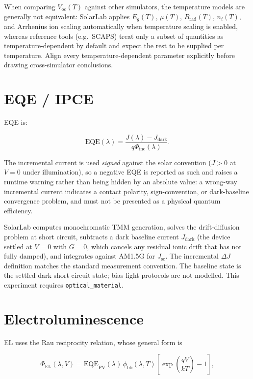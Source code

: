 \documentclass[
  11pt,
  american,
]{report}
\begin{document}
When comparing \(V_\mathrm{oc}(T)\) against other simulators, the
temperature models are generally not equivalent: SolarLab applies
\(E_g(T)\), \(\mu(T)\), \(B_\mathrm{rad}(T)\), \(n_i(T)\), and Arrhenius
ion scaling automatically when temperature scaling is enabled, whereas
reference tools (e.g.~SCAPS) treat only a subset of quantities as
temperature-dependent by default and expect the rest to be supplied per
temperature. Align every temperature-dependent parameter explicitly
before drawing cross-simulator conclusions.

\hypertarget{eqe-ipce}{%
\section{EQE / IPCE}\label{eqe-ipce}}

EQE is:

\[
\mathrm{EQE}(\lambda)
=
\frac{J(\lambda)-J_\mathrm{dark}}
{q\Phi_\mathrm{inc}(\lambda)}.
\]

The incremental current is used \emph{signed} against the solar
convention (\(J>0\) at \(V=0\) under illumination), so a negative EQE is
reported as such and raises a runtime warning rather than being hidden
by an absolute value: a wrong-way incremental current indicates a
contact polarity, sign-convention, or dark-baseline convergence problem,
and must not be presented as a physical quantum efficiency.

SolarLab computes monochromatic TMM generation, solves the
drift-diffusion problem at short circuit, subtracts a dark baseline
current \(J_\mathrm{dark}\) (the device settled at \(V=0\) with \(G=0\),
which cancels any residual ionic drift that has not fully damped), and
integrates against AM1.5G for \(J_\mathrm{sc}\). The incremental
\(\Delta J\) definition matches the standard measurement convention. The
baseline state is the settled dark short-circuit state; bias-light
protocols are not modelled. This experiment requires
\texttt{optical\_material}.

\hypertarget{electroluminescence}{%
\section{Electroluminescence}\label{electroluminescence}}

EL uses the Rau reciprocity relation, whose general form is

\[
\Phi_\mathrm{EL}(\lambda,V)
=
\mathrm{EQE}_\mathrm{PV}(\lambda)\,
\phi_\mathrm{bb}(\lambda,T)
\left[\exp\left(\frac{qV}{kT}\right)-1\right],
\]
\end{document}
